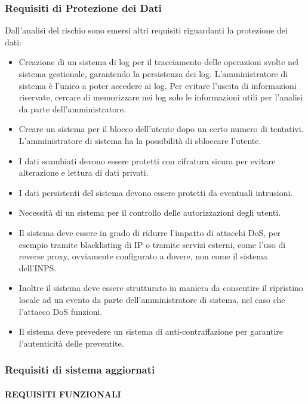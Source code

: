 \documentclass[a4paper]{article}
\begin{document}
\subsubsection{Requisiti di Protezione dei Dati}

Dall’analisi del rischio sono emersi altri requisiti riguardanti la protezione dei dati:

\begin{itemize}
    \item Creazione di un sistema di log per il tracciamento delle operazioni svolte nel sistema gestionale, garantendo la persistenza dei log. L'amministratore di sistema è l'unico a poter accedere ai log. Per evitare l'uscita di informazioni riservate, cercare di memorizzare nei log solo le informazioni utili per l'analisi da parte dell'amministratore.
    \item Creare un sistema per il blocco dell'utente dopo un certo numero di tentativi. L'amministratore di sistema ha la possibilità di sbloccare l'utente.
    \item I dati scambiati devono essere protetti con cifratura sicura per evitare alterazione e lettura di dati privati.
    \item I dati persistenti del sistema devono essere protetti da eventuali intrusioni.
    \item Necessità di un sistema per il controllo delle autorizzazioni degli utenti.
    \item Il sistema deve essere in grado di ridurre l'impatto di attacchi DoS, per esempio tramite blacklisting di IP o tramite servizi esterni, come l'uso di reverse proxy, ovviamente configurato a dovere, non come il sistema dell'INPS.
    \item Inoltre il sistema deve essere strutturato in maniera da consentire il ripristino locale ad un evento da parte dell'amministratore di sistema, nel caso che l'attacco DoS funzioni.
    \item Il sistema deve prevedere un sistema di anti-contraffazione per garantire l'autenticità delle preventite.
\end{itemize}

\subsubsection{Requisiti di sistema aggiornati}

\paragraph{REQUISITI FUNZIONALI}
\end{document}
